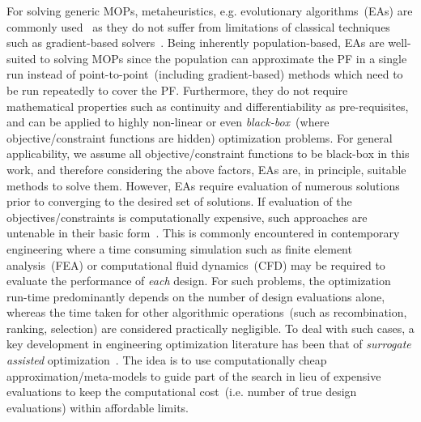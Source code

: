 \documentclass[twocolumn,10pt]{asme2ej}
\begin{document}
For solving generic MOPs, metaheuristics, e.g. evolutionary algorithms~(EAs) are commonly used~\cite{deb2001multi} {\color{blue}as they do not suffer from limitations of classical techniques such as gradient-based solvers~\cite{KHTwangreview2007}. Being inherently population-based, EAs are well-suited to solving MOPs since the population can approximate the PF in a single run instead of point-to-point~(including gradient-based) methods which need to be run repeatedly to cover the PF. Furthermore, they do not require mathematical properties such as continuity and differentiability as pre-requisites, and can be applied to highly non-linear or even \emph{black-box}~(where objective/constraint functions are hidden) optimization problems. For general applicability, we assume all objective/constraint functions to be black-box in this work, and therefore considering the above factors, EAs are, in principle, suitable methods to solve them.} However, EAs require evaluation of numerous solutions prior to converging to the desired set of solutions. If evaluation of the objectives/constraints is computationally expensive, such approaches are untenable  in their basic form~\cite{KHTjmd2016,KHTjin2005csf}. This is commonly encountered in contemporary engineering where a time consuming simulation such as finite element analysis~(FEA) or computational fluid dynamics~(CFD) may be required to evaluate the performance of \emph{each} design. For such problems, the optimization run-time predominantly depends on the number of design evaluations alone, whereas the time taken for other algorithmic operations~(such as recombination, ranking, selection) are considered practically negligible. To deal with such cases, a key development in engineering optimization literature has been that of \textit{surrogate assisted} optimization~\cite{KHTwangreview2007,KHTjinswarm2011}. The idea is to use computationally cheap approximation/meta-models to guide part of the search in lieu of expensive evaluations to keep the computational cost~(i.e. number of true design evaluations) within affordable limits. 
\end{document}
